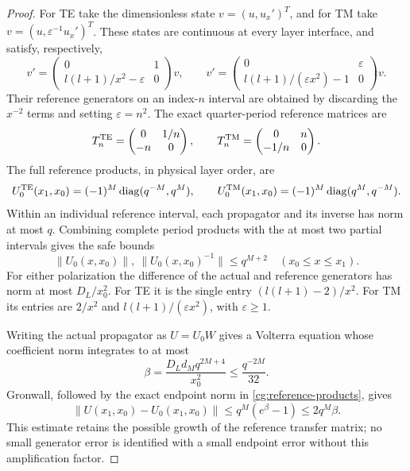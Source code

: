 \begin{proof}
For TE take the dimensionless state $v=(u,u_x')^T$, and for TM
take $v=(u,\varepsilon^{-1}u_x')^T$.  These states are continuous
at every layer interface, and satisfy, respectively,
\begin{equation}\label{cg:generators}
 v'=\begin{pmatrix}0&1\\l(l+1)/x^2-\varepsilon&0\end{pmatrix}v,
 \qquad
 v'=\begin{pmatrix}0&\varepsilon\\l(l+1)/(\varepsilon x^2)-1&0\end{pmatrix}v.
\end{equation}
Their reference generators on an index-$n$ interval are obtained
by discarding the $x^{-2}$ terms and setting $\varepsilon=n^2$.
The exact quarter-period reference matrices are
\begin{equation}\label{cg:quarter-matrices}
 T_n^{\rm TE}=\begin{pmatrix}0&1/n\\-n&0\end{pmatrix},\qquad
 T_n^{\rm TM}=\begin{pmatrix}0&n\\-1/n&0\end{pmatrix}.
\end{equation}
The full reference products, in physical layer order, are
\begin{equation}\label{cg:reference-products}
 U_0^{\rm TE}(x_1,x_0)=(-1)^M\operatorname{diag}(q^{-M},q^M),
 \qquad
 U_0^{\rm TM}(x_1,x_0)=(-1)^M\operatorname{diag}(q^M,q^{-M}).
\end{equation}
Within an individual reference interval, each propagator and its
inverse has norm at most $q$.  Combining complete period products
with the at most two partial intervals gives the safe bounds
\begin{equation}\label{cg:prefix-bounds}
 \|U_0(x,x_0)\|,\ \|U_0(x,x_0)^{-1}\|\leq q^{M+2}
 \quad(x_0\leq x\leq x_1).
\end{equation}
For either polarization the difference of the actual and reference
generators has norm at most $D_L/x_0^2$.  For TE it is the single
entry $(l(l+1)-2)/x^2$.  For TM its entries are $2/x^2$ and
$l(l+1)/(\varepsilon x^2)$, with $\varepsilon\geq1$.

Writing the actual propagator as $U=U_0W$ gives a Volterra equation
whose coefficient norm integrates to at most
\begin{equation}\label{cg:beta}
 \beta=\frac{D_Ld_Mq^{2M+4}}{x_0^2}
       \leq\frac{q^{-2M}}{32}.
\end{equation}
Gronwall, followed by the exact endpoint norm in
\eqref{cg:reference-products}, gives
\begin{equation}\label{cg:transfer-error}
 \|U(x_1,x_0)-U_0(x_1,x_0)\|
       \leq q^M(e^\beta-1)\leq2q^M\beta.
\end{equation}
This estimate retains the possible growth of the reference transfer
matrix; no small generator error is identified with a small endpoint
error without this amplification factor.


\end{proof}
